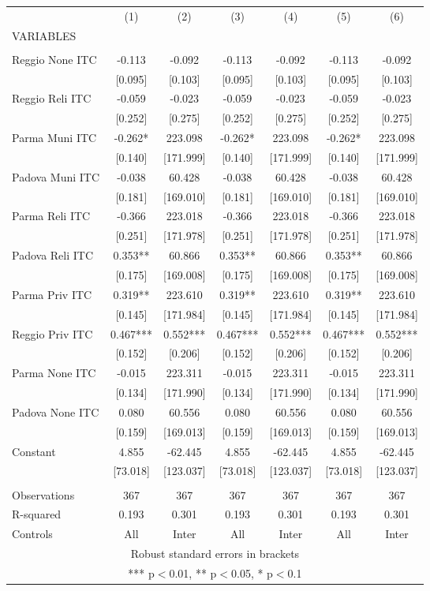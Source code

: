\begin{tabular}{lcccccc} \hline
 & (1) & (2) & (3) & (4) & (5) & (6) \\
VARIABLES &  &  &  &  &  &  \\ \hline
 &  &  &  &  &  &  \\
Reggio None ITC & -0.113 & -0.092 & -0.113 & -0.092 & -0.113 & -0.092 \\
 & [0.095] & [0.103] & [0.095] & [0.103] & [0.095] & [0.103] \\
Reggio Reli ITC & -0.059 & -0.023 & -0.059 & -0.023 & -0.059 & -0.023 \\
 & [0.252] & [0.275] & [0.252] & [0.275] & [0.252] & [0.275] \\
Parma Muni ITC & -0.262* & 223.098 & -0.262* & 223.098 & -0.262* & 223.098 \\
 & [0.140] & [171.999] & [0.140] & [171.999] & [0.140] & [171.999] \\
Padova Muni ITC & -0.038 & 60.428 & -0.038 & 60.428 & -0.038 & 60.428 \\
 & [0.181] & [169.010] & [0.181] & [169.010] & [0.181] & [169.010] \\
Parma Reli ITC & -0.366 & 223.018 & -0.366 & 223.018 & -0.366 & 223.018 \\
 & [0.251] & [171.978] & [0.251] & [171.978] & [0.251] & [171.978] \\
Padova Reli ITC & 0.353** & 60.866 & 0.353** & 60.866 & 0.353** & 60.866 \\
 & [0.175] & [169.008] & [0.175] & [169.008] & [0.175] & [169.008] \\
Parma Priv ITC & 0.319** & 223.610 & 0.319** & 223.610 & 0.319** & 223.610 \\
 & [0.145] & [171.984] & [0.145] & [171.984] & [0.145] & [171.984] \\
Reggio Priv ITC & 0.467*** & 0.552*** & 0.467*** & 0.552*** & 0.467*** & 0.552*** \\
 & [0.152] & [0.206] & [0.152] & [0.206] & [0.152] & [0.206] \\
Parma None ITC & -0.015 & 223.311 & -0.015 & 223.311 & -0.015 & 223.311 \\
 & [0.134] & [171.990] & [0.134] & [171.990] & [0.134] & [171.990] \\
Padova None ITC & 0.080 & 60.556 & 0.080 & 60.556 & 0.080 & 60.556 \\
 & [0.159] & [169.013] & [0.159] & [169.013] & [0.159] & [169.013] \\
Constant & 4.855 & -62.445 & 4.855 & -62.445 & 4.855 & -62.445 \\
 & [73.018] & [123.037] & [73.018] & [123.037] & [73.018] & [123.037] \\
 &  &  &  &  &  &  \\
Observations & 367 & 367 & 367 & 367 & 367 & 367 \\
R-squared & 0.193 & 0.301 & 0.193 & 0.301 & 0.193 & 0.301 \\
 Controls & All & Inter & All & Inter & All & Inter \\ \hline
\multicolumn{7}{c}{ Robust standard errors in brackets} \\
\multicolumn{7}{c}{ *** p$<$0.01, ** p$<$0.05, * p$<$0.1} \\
\end{tabular}
